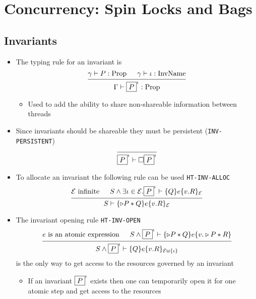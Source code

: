 \section{Concurrency: Spin Locks and Bags}


\subsection{Invariants}
\begin{itemize}
	\item The typing rule for an invariant is
  \[
  \begin{prooftree} 
    \hypo{\gamma \vdash P: \text{Prop}}
    \hypo{\gamma \vdash \iota : \text{InvName}}
    \infer2{\Gamma \vdash \inv{P}^\iota: \text{Prop} }
  \end{prooftree}
  \]
  \begin{itemize}
  	\item Used to add the ability to share non-shareable information between threads
  \end{itemize}
  \item Since invariants should be shareable they must be persistent (\texttt{INV-PERSISTENT})
  \[
  \begin{prooftree} 
    \infer0{\inv{P}^{\iota} \vdash \square \inv{P}^{\iota}} 
  \end{prooftree}
  \]
  \item To allocate an invariant the following rule can be used \texttt{HT-INV-ALLOC}
  \[
  \begin{prooftree} 
    \hypo{\mathcal E \text{ infinite}}
    \hypo{S \land \exists \iota \in \mathcal E . \inv{P}^\iota \vdash \{Q\} e \{v.R\}_{\mathcal E}}
    \infer2{S \vdash \{\later P * Q\} e \{v.R\}_{\mathcal E}} 
  \end{prooftree}
  \]
  \item The invariant opening rule \texttt{HT-INV-OPEN}
  \[
  \begin{prooftree} 
    \hypo{e \text{ is an atomic expression}}
    \hypo{S \land \inv{P}^\iota \vdash \{\later P * Q\} e \{ v. \later P * R \}}
    \infer2{S \land \inv{P}^\iota \vdash \{Q\} e \{v.R\}_{\mathcal E \uplus \{\iota\}}} 
  \end{prooftree}
  \]
  is the only way to get access to the resources governed by an invariant
  \begin{itemize}
  	\item If an invariant $\fbox{\ensuremath{P}}^\iota$ exists then one can temporarily open it for one atomic step and get access to the resources

\end{itemize}
\end{itemize}
